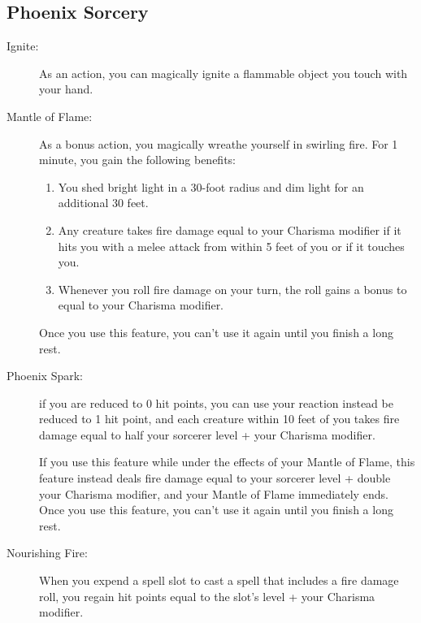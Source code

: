 \documentclass[letterpaper,10pt,twoside,twocolumn,openany]{book}
\begin{document}
\subsection{Phoenix Sorcery}

\begin{description}
	\item[Ignite:] As an action, you can magically ignite a flammable object you touch with your hand. 
	\item[Mantle of Flame:] As a bonus action, you magically wreathe yourself in swirling fire. For 1 minute, you gain the following benefits:
	
	\begin{enumerate}
		\item You shed bright light in a 30-foot radius and dim light for an additional 30 feet.
		\item Any creature takes fire damage equal to your Charisma modifier if it hits you with a melee attack from within 5 feet of you or if it touches you.
		\item Whenever you roll fire damage on your turn, the roll gains a bonus to equal to your Charisma modifier. 
	\end{enumerate}
	
	Once you use this feature, you can't use it again until you finish a long rest. 
	\item[Phoenix Spark:]  if you are reduced to 0 hit points, you can use your reaction instead be reduced to 1 hit point, and each creature within 10 feet of you takes fire damage equal to half your sorcerer level + your Charisma modifier.
	
	If you use this feature while under the effects of your Mantle of Flame, this feature instead deals fire damage equal to your sorcerer level + double your Charisma modifier, and your Mantle of Flame immediately ends. Once you use this feature, you can't use it again until you finish a long rest. 
	\item[Nourishing Fire:] When you expend a spell slot to cast a spell that includes a fire damage roll, you regain hit points equal to the slot's level + your Charisma modifier. 
\end{description}
\end{document}
